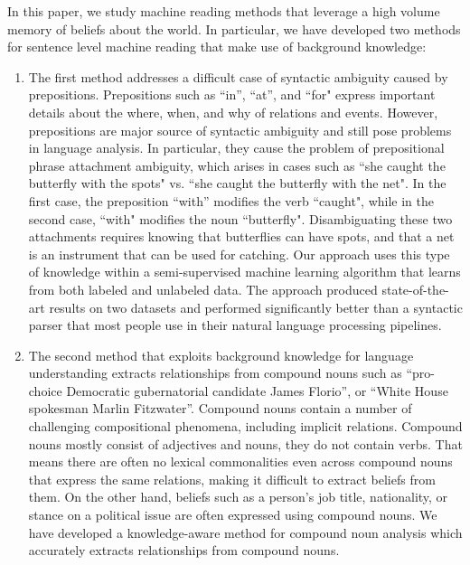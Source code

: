 \documentclass[jair,twoside,11pt,theapa]{article}
\begin{document}
 In this paper, we  study machine reading methods that leverage a  high volume  memory  of beliefs about the world. 
In particular, we have developed two methods for sentence level machine reading  that make use of  background knowledge:
\begin{enumerate}

\item The first method addresses  a difficult case of syntactic ambiguity caused by prepositions. Prepositions  such as ``in'', ``at'', and ``for" express important details about the where, when, and why of relations and events. However, prepositions are major source of syntactic ambiguity and still pose problems in language analysis. In particular, they cause the problem of prepositional phrase attachment ambiguity, which  arises in cases such as  ``she caught the butterfly with the spots" vs. ``she caught the butterfly with the net". In the first case,  the preposition ``with''  modifies the verb ``caught", while in the second case, ``with" modifies the noun ``butterfly". Disambiguating  these two attachments requires knowing that butterflies can have spots,  and that a net is an instrument that can be used for catching. Our  approach  uses this type of knowledge within a semi-supervised machine learning algorithm that learns from both labeled and unlabeled data. The approach produced state-of-the-art results on two datasets and  performed significantly better than  a syntactic parser that most people use in their natural language processing pipelines. 
 
 \item The second method that exploits background knowledge for language understanding extracts relationships from compound nouns such as  ``pro-choice Democratic gubernatorial  candidate  James Florio'', or  ``White  House spokesman Marlin Fitzwater''.  Compound nouns  
contain a number of challenging compositional phenomena, including implicit relations. Compound nouns mostly consist of adjectives and nouns, they do not contain verbs. That means there are often no lexical commonalities even across compound nouns that express the same relations,  making it difficult to extract beliefs from them. On the other hand, beliefs such as a person's job title, nationality, or stance on a political issue are often expressed using compound nouns. We have developed a  knowledge-aware method for compound noun analysis which accurately extracts relationships from compound nouns.
 \end{enumerate}
 
\end{document}
